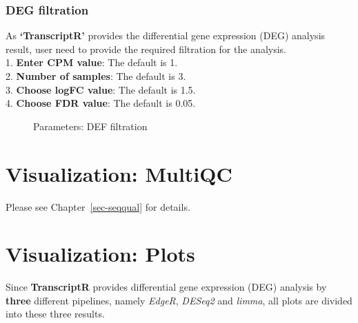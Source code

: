 \documentclass[
  a4paper,
  DIV=11,
  numbers=noendperiod,
  oneside,
  open=any]{scrreport}
\begin{document}
\subsubsection{DEG filtration}\label{deg-filtration}

As \textbf{`TranscriptR'} provides the differential gene expression
(DEG) analysis result, user need to provide the required filtration for
the analysis.\\
1. \textbf{Enter CPM value}: The default is 1.\\
2. \textbf{Number of samples}: The default is 3.\\
3. \textbf{Choose logFC value}: The default is 1.5.\\
4. \textbf{Choose FDR value}: The default is 0.05.

\begin{figure}[H]


\caption{\label{fig-trans6}Parameters: DEF filtration}

\end{figure}%

\section{Visualization: MultiQC}\label{visualization-multiqc}

Please see Chapter~\ref{sec-seqqual} for details.

\section{Visualization: Plots}\label{visualization-plots}

Since \textbf{TranscriptR} provides differential gene expression (DEG)
analysis by \textbf{three} different pipelines, namely \emph{EdgeR},
\emph{DESeq2} and \emph{limma}, all plots are divided into these three
results.
\end{document}
